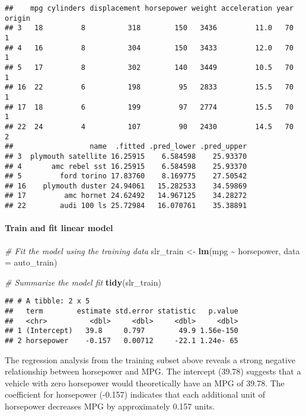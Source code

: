 \documentclass[
]{article}
\newenvironment{Shaded}{\begin{snugshade}}{\end{snugshade}}
\newcommand{\AttributeTok}[1]{\textcolor[rgb]{0.13,0.29,0.53}{#1}}
\newcommand{\CommentTok}[1]{\textcolor[rgb]{0.56,0.35,0.01}{\textit{#1}}}
\newcommand{\FunctionTok}[1]{\textcolor[rgb]{0.13,0.29,0.53}{\textbf{#1}}}
\newcommand{\NormalTok}[1]{#1}
\newcommand{\OtherTok}[1]{\textcolor[rgb]{0.56,0.35,0.01}{#1}}
\newcommand{\SpecialCharTok}[1]{\textcolor[rgb]{0.81,0.36,0.00}{\textbf{#1}}}
\begin{document}
\begin{verbatim}
##    mpg cylinders displacement horsepower weight acceleration year origin
## 3   18         8          318        150   3436         11.0   70      1
## 4   16         8          304        150   3433         12.0   70      1
## 5   17         8          302        140   3449         10.5   70      1
## 16  22         6          198         95   2833         15.5   70      1
## 17  18         6          199         97   2774         15.5   70      1
## 22  24         4          107         90   2430         14.5   70      2
##                  name  .fitted .pred_lower .pred_upper
## 3  plymouth satellite 16.25915    6.584598    25.93370
## 4       amc rebel sst 16.25915    6.584598    25.93370
## 5         ford torino 17.83760    8.169775    27.50542
## 16    plymouth duster 24.94061   15.282533    34.59869
## 17         amc hornet 24.62492   14.967125    34.28272
## 22        audi 100 ls 25.72984   16.070761    35.38891
\end{verbatim}

\paragraph{Train and fit linear model}\label{train-and-fit-linear-model}

\begin{Shaded}
\begin{Highlighting}[]
\CommentTok{\# Fit the model using the training data}
\NormalTok{slr\_train }\OtherTok{\textless{}{-}} \FunctionTok{lm}\NormalTok{(mpg }\SpecialCharTok{\textasciitilde{}}\NormalTok{ horsepower, }\AttributeTok{data =}\NormalTok{ auto\_train)}

\CommentTok{\# Summarize the model fit}
\FunctionTok{tidy}\NormalTok{(slr\_train)}
\end{Highlighting}
\end{Shaded}

\begin{verbatim}
## # A tibble: 2 x 5
##   term        estimate std.error statistic   p.value
##   <chr>          <dbl>     <dbl>     <dbl>     <dbl>
## 1 (Intercept)   39.8     0.797        49.9 1.56e-150
## 2 horsepower    -0.157   0.00712     -22.1 1.24e- 65
\end{verbatim}

The regression analysis from the training subset above reveals a strong
negative relationship between horsepower and MPG. The intercept (39.78)
suggests that a vehicle with zero horsepower would theoretically have an
MPG of 39.78. The coefficient for horsepower (-0.157) indicates that
each additional unit of horsepower decreases MPG by approximately 0.157
units.
\end{document}
